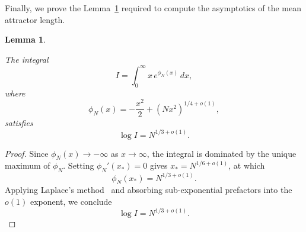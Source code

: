 \documentclass[11pt, reqno]{elsarticle}%
\theoremstyle{plain}
\newtheorem{lemma}[thm]{Lemma}
\begin{document}
Finally, we prove the Lemma~\ref{lemma:asymptotics} required to compute the asymptotics of the mean attractor length.
\begin{lemma}\label{lemma:asymptotics}
    

The integral \begin{equation}
  I = \int_{0}^{\infty} x\,e^{\phi_N(x)}\,dx,
  \label{eq:substituted}
\end{equation}
where
\begin{equation}
  \phi_N(x) = -\frac{x^2}{2} + \left(Nx^2\right)^{1/4+o(1)},
  \label{eq:phase}
\end{equation}
satisfies 
\begin{equation}
  \log I = N^{1/3+o(1)}.
  \label{eq:full_asymptotic}
\end{equation}
\end{lemma}
\begin{proof}
Since $\phi_N(x)\to-\infty$ as $x\to\infty$, the integral is dominated by 
the unique maximum of $\phi_N$. Setting $\phi_N'(x_*)=0$ gives 
$x_* = N^{1/6+o(1)}$, at which
\begin{equation}
  \phi_N(x_*) = N^{1/3+o(1)}.
\end{equation}
Applying Laplace's method~\cite{debruijn1981asymptotic} and absorbing 
sub-exponential prefactors into the $o(1)$ exponent, we conclude
\begin{equation}
  \log I = N^{1/3+o(1)}.
  \label{eq:full_asymptotic}
\end{equation}
\end{proof}
















%
%

% 
%


\end{document}
